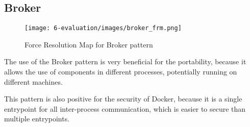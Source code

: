\subsection{Broker}
\begin{figure}[H]
\centering
\texttt{[image: 6-evaluation/images/broker\_frm.png]}
\caption{Force Resolution Map for Broker pattern}
\label{fig:broker-frm}
\end{figure}
The use of the Broker pattern is very beneficial for the portability, because it allows the use of components in different processes, potentially running on different machines.

This pattern is also positive for the security of Docker, because it is a single entrypoint for all inter-process communication, which is easier to secure than multiple entrypoints.


